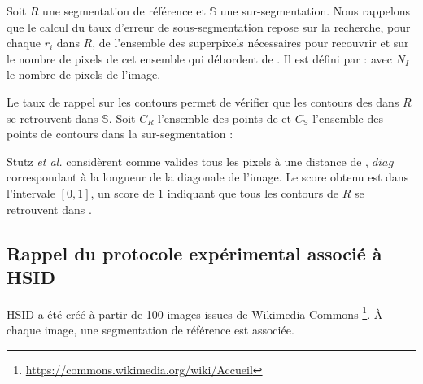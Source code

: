 Soit $R$ une segmentation de référence et $\mathbb{S}$  une sur-segmentation. Nous rappelons que le calcul du taux d'erreur de sous-segmentation repose sur la recherche, pour chaque  $r_{i}$  dans $R$, de l'ensemble des superpixels nécessaires pour  recouvrir et sur le nombre de pixels de cet ensemble  qui débordent de . Il est défini par : 
avec $N_{I}$ le nombre de pixels de l'image.

Le taux de rappel sur les contours permet de vérifier que les contours des  dans $R$ se retrouvent dans $\mathbb{S}$.  Soit $C_{R}$ l'ensemble des points de  et $C_{\mathbb{S}}$ l'ensemble des points de contours dans la sur-segmentation :

Stutz \textit{et al.} considèrent comme valides tous les pixels à une distance de , $diag$  correspondant à la longueur de la diagonale de l'image.   Le score obtenu est dans l'intervale $[0,1]$, un score de $1$ indiquant que tous les contours de $R$ se retrouvent dans . 

\subsection{Rappel du protocole expérimental associé à HSID}

HSID a été créé à partir de 100 images issues de Wikimedia Commons \footnote{\url{https://commons.wikimedia.org/wiki/Accueil}}. À chaque image, une segmentation de référence est associée.


